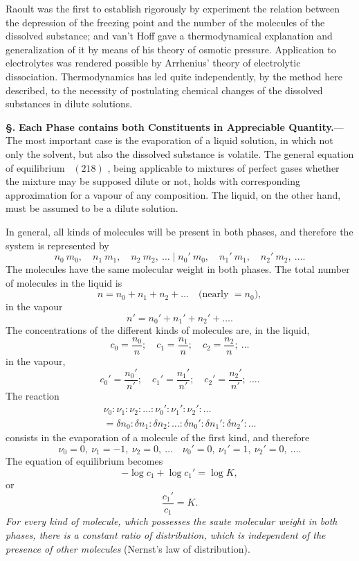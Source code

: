 \documentclass[12pt]{book}[2005/09/16]
\newcommand{\Chg}[2]{#2}
\newcommand{\Add}[1]{\Chg{}{#1}}
\newcommand{\Section}[1]{
  \medskip\par\textbf{§\;#1}
  \label{section:#1}
}
\newcommand{\Eq}[1]{%
  \hyperref[eqn:#1]{\ensuremath{#1}}%
}
\newcommand{\PageSep}[1]{\ignorespaces}
\newcommand{\Topic}[1]{\textbf{#1}}
\begin{document}
Raoult was the first to establish rigorously by experiment
the relation between the depression of the freezing
point and the number of the molecules of the dissolved
substance; and van't Hoff gave a thermodynamical explanation
and generalization of it by means of his theory of
osmotic pressure. Application to electrolytes was rendered
possible by Arrhenius' theory of electrolytic dissociation.
%
%
%
Thermodynamics has led quite independently, by the method
here described, to the necessity of postulating chemical
changes of the dissolved substances in dilute solutions.

\Section{274.} \Topic{Each Phase contains both Constituents in
Appreciable Quantity.}---The most important case is the
evaporation of a liquid solution, in which not only the
solvent, but also the dissolved substance is volatile. The
general equation of equilibrium~\Eq{(218)}, being applicable to
\PageSep{253}
mixtures of perfect gases whether the mixture may be
supposed dilute or not, holds with corresponding approximation
for a vapour of any composition. The liquid, on the
other hand, must be assumed to be a dilute solution.

In general, all kinds of molecules will be present in
%
both phases, and therefore the system is represented by
\[
n_{0}\ m_{0},\quad
n_{1}\ m_{1},\quad
n_{2}\ m_{2},\ \dots \mid
n_{0}'\ m_{0},\quad
n_{1}'\ m_{1},\quad
n_{2}'\ m_{2},\ \dots\Add{.}
\]
The molecules have the same molecular weight in both
phases. The total number of molecules in the liquid is
\[
n = n_{0} + n_{1} + n_{2} + \dots\quad\text{(nearly $= n_{0}$)},
\]
in the vapour
\[
n' = n_{0}' + n_{1}' + n_{2}' + \dots\Add{.}
\]
The concentrations of the different kinds of molecules are,
in the liquid,
\[
c_{0} = \frac{n_{0}}{n};\quad
c_{1} = \frac{n_{1}}{n};\quad
c_{2} = \frac{n_{2}}{n};\ \dots
\]
in the vapour,
\[
c_{0}' = \frac{n_{0}'}{n'};\quad
c_{1}' = \frac{n_{1}'}{n'};\quad
c_{2}' = \frac{n_{2}'}{n'};\ \dots\Add{.}
\]
The reaction
\begin{multline*}
\nu_{0} : \nu_{1} : \nu_{2} : \dots : \nu_{0}' : \nu_{1}' : \nu_{2}' : \dots \\
  = \delta n_{0} : \delta n_{1} : \delta n_{2} : \dots : \delta n_{0}' : \delta n_{1}' : \delta n_{2}' : \dots
\end{multline*}
consists in the evaporation of a molecule of the first kind,
and therefore
\[
\nu_{0} = 0,\
\nu_{1} = -1,\
\nu_{2} = 0,\ \dots\quad
\nu_{0}' = 0,\
\nu_{1}' = 1,\
\nu_{2}' = 0,\ \dots\Add{.}
\]
The equation of equilibrium becomes
\[
-\log c_{1} + \log c_{1}' = \log K,
\]
or
\[
\frac{c_{1}'}{c_{1}} = K.
\]
\PageSep{254}
\emph{For every kind of molecule, which possesses the saute molecular
weight in both phases, there is a constant ratio of distribution,
which is independent of the presence of other molecules}
(Nernst's law of distribution).
\index{Distribution law (Nernst's)}%
\index{Laws:!Nernst's}%
\index{Nernst}%
%
\end{document}

